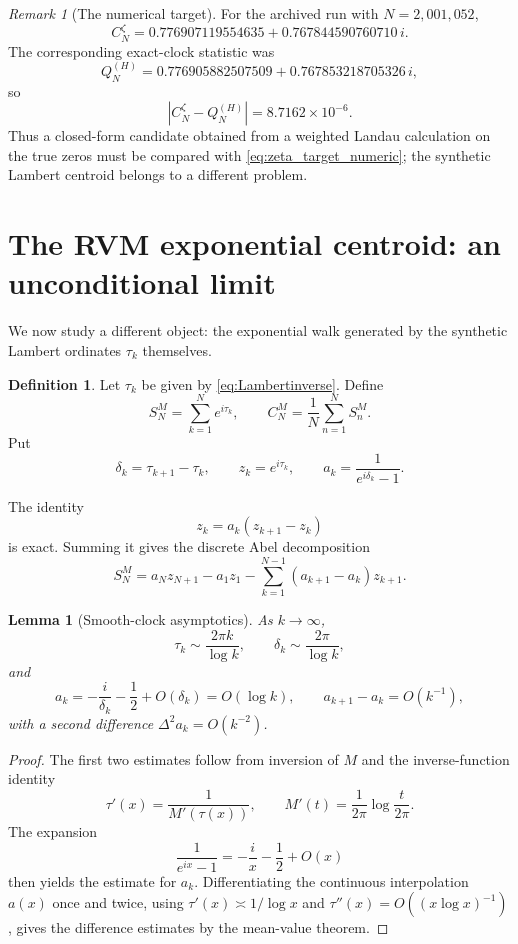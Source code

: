 \documentclass[11pt]{amsart}
\numberwithin{equation}{section}
\newtheorem{lemma}[theorem]{Lemma}
\theoremstyle{definition}
\newtheorem{definition}[theorem]{Definition}
\theoremstyle{remark}
\newtheorem{remark}[theorem]{Remark}
\begin{document}
\begin{remark}[The numerical target]\label{rem:true_zero_target}
For the archived run with $N=2{,}001{,}052$,
\begin{equation}\label{eq:zeta_target_numeric}
C_N^{\zeta}
=0.776907119554635+0.767844590760710\,i.
\end{equation}
The corresponding exact-clock statistic was
\begin{equation}\label{eq:QH_target_numeric}
Q_N^{(H)}
=0.776905882507509+0.767853218705326\,i,
\end{equation}
so
\begin{equation}\label{eq:finite_level1_gap}
\left|C_N^{\zeta}-Q_N^{(H)}\right|
=8.7162\times10^{-6}.
\end{equation}
Thus a closed-form candidate obtained from a weighted Landau calculation on the true zeros must be compared with \eqref{eq:zeta_target_numeric}; the synthetic Lambert centroid belongs to a different problem.
\end{remark}

\section{The RVM exponential centroid: an unconditional limit}\label{sec:rvm}

We now study a different object: the exponential walk generated by the synthetic Lambert ordinates $\tau_k$ themselves.

\begin{definition}
Let $\tau_k$ be given by \eqref{eq:Lambertinverse}.  Define
\[
S_N^{M}=\sum_{k=1}^N e^{i\tau_k},\qquad
C_N^{M}=\frac1N\sum_{n=1}^N S_n^M.
\]
Put
\[
\delta_k=\tau_{k+1}-\tau_k,
\qquad
z_k=e^{i\tau_k},
\qquad
 a_k=\frac1{e^{i\delta_k}-1}.
\]
\end{definition}

The identity
\[
z_k=a_k(z_{k+1}-z_k)
\]
is exact.  Summing it gives the discrete Abel decomposition
\begin{equation}\label{eq:AbelSN}
S_N^{M}
=a_Nz_{N+1}-a_1z_1-
\sum_{k=1}^{N-1}(a_{k+1}-a_k)z_{k+1}.
\end{equation}

\begin{lemma}[Smooth-clock asymptotics]\label{lem:clockasym}
As $k\to\infty$,
\[
\tau_k\sim\frac{2\pi k}{\log k},\qquad
\delta_k\sim\frac{2\pi}{\log k},
\]
and
\[
a_k=-\frac{i}{\delta_k}-\frac12+O(\delta_k)=O(\log k),
\qquad
a_{k+1}-a_k=O(k^{-1}),
\]
with a second difference $\Delta^2a_k=O(k^{-2})$.
\end{lemma}
\begin{proof}
The first two estimates follow from inversion of $M$ and the inverse-function identity
\[
\tau'(x)=\frac1{M'(\tau(x))},\qquad
M'(t)=\frac1{2\pi}\log\frac{t}{2\pi}.
\]
The expansion
\[
\frac1{e^{ix}-1}=-\frac{i}{x}-\frac12+O(x)
\]
then yields the estimate for $a_k$.  Differentiating the continuous interpolation $a(x)$ once and twice, using $\tau'(x)\asymp1/\log x$ and $\tau''(x)=O((x\log x)^{-1})$, gives the difference estimates by the mean-value theorem.
\end{proof}
\end{document}

